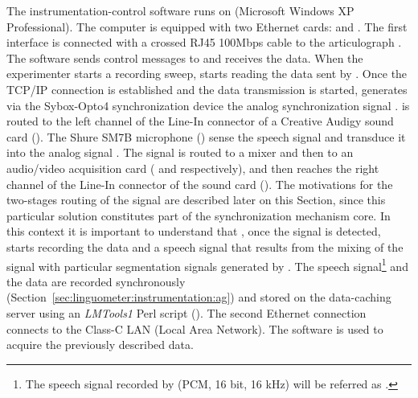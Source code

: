 The instrumentation-control software runs on  (Microsoft Windows XP
Professional).
The computer is equipped with two Ethernet cards:  and .
The first interface is connected with a crossed RJ45 100Mbps cable to the
articulograph .
The  software sends control messages to  and receives
the  data.
When the experimenter starts a recording sweep,  starts reading
the data sent by . Once the TCP/IP connection is established and the
data transmission is started,  generates via the Sybox-Opto4
synchronization device the analog synchronization signal .
 is routed to the left channel of the Line-In connector of a 
Creative Audigy sound card ().
The Shure SM7B microphone () sense the speech signal and transduce it
into the analog signal .
The  signal is routed to a mixer and then to an audio/video
acquisition card ( and  respectively), and then reaches the 
right channel of the Line-In connector of the  sound card
().
The motivations for the two-stages routing of the  signal are
described later on this Section, since this particular solution constitutes part
of the synchronization mechanism core.
In this context it is important to understand that , once 
the  signal is detected, starts recording the  data and
a speech signal that results from the mixing of the  signal with
particular segmentation signals generated by .
The speech signal\footnote{The speech signal recorded by  (PCM, 16 bit,
16 kHz) will be referred as .} and the  data are recorded
synchronously (Section~\ref{sec:linguometer:instrumentation:ag}) and stored on
the data-caching server  using an \emph{LMTools1} Perl script
().
The second Ethernet connection connects  to the  Class-C 
LAN (Local Area Network).
The  software is used to acquire the previously described 
 data.

